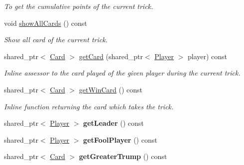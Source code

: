 \begin{DoxyCompactItemize}
\begin{DoxyCompactList}\small\item\em \-To get the cumulative points of the current trick. \end{DoxyCompactList}\item 
\hypertarget{classTrick_af156d49d692f5168320ebc30aa084da1}{void \hyperlink{classTrick_af156d49d692f5168320ebc30aa084da1}{show\-All\-Cards} () const }\label{classTrick_af156d49d692f5168320ebc30aa084da1}

\begin{DoxyCompactList}\small\item\em \-Show all card of the current trick. \end{DoxyCompactList}\item 
\hypertarget{classTrick_a1649b27628cb224f3eb98f56ea00f5ac}{shared\-\_\-ptr$<$ \hyperlink{classCard}{\-Card} $>$ \hyperlink{classTrick_a1649b27628cb224f3eb98f56ea00f5ac}{get\-Card} (shared\-\_\-ptr$<$ \hyperlink{classPlayer}{\-Player} $>$ player) const }\label{classTrick_a1649b27628cb224f3eb98f56ea00f5ac}

\begin{DoxyCompactList}\small\item\em \-Inline assessor to the card played of the given player during the current trick. \end{DoxyCompactList}\item 
\hypertarget{classTrick_ae5e65fbe08d6df0ca71224e465424c6b}{shared\-\_\-ptr$<$ \hyperlink{classCard}{\-Card} $>$ \hyperlink{classTrick_ae5e65fbe08d6df0ca71224e465424c6b}{get\-Win\-Card} () const }\label{classTrick_ae5e65fbe08d6df0ca71224e465424c6b}

\begin{DoxyCompactList}\small\item\em \-Inline function returning the card which takes the trick. \end{DoxyCompactList}\item 
\hypertarget{classTrick_a87cf6697a5f9f417e19c2749e73ae2be}{shared\-\_\-ptr$<$ \hyperlink{classPlayer}{\-Player} $>$ {\bfseries get\-Leader} () const }\label{classTrick_a87cf6697a5f9f417e19c2749e73ae2be}

\item 
\hypertarget{classTrick_a4d43afa1ae8417094be02494852f7c56}{shared\-\_\-ptr$<$ \hyperlink{classPlayer}{\-Player} $>$ {\bfseries get\-Fool\-Player} () const }\label{classTrick_a4d43afa1ae8417094be02494852f7c56}

\item 
\hypertarget{classTrick_a21f11527bb41c8a9a5ad3706c220ba4c}{shared\-\_\-ptr$<$ \hyperlink{classCard}{\-Card} $>$ {\bfseries get\-Greater\-Trump} () const }\label{classTrick_a21f11527bb41c8a9a5ad3706c220ba4c}

\end{DoxyCompactItemize}


